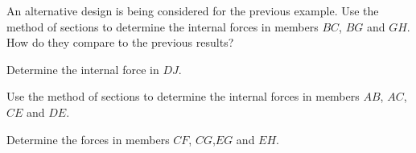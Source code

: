 \documentclass[9pt, xcolor={svgnames, x11names},professionalfonts]{beamer}
\def\scale{1}
\begin{document}
\begin{frame}{}
	\def\scale{0.5125}
	\begin{myexer}{}{}
		\parb\centering
		
		\pars
		An alternative design is being considered for the previous example. 
		Use the method of sections to determine the internal forces in members $BC$, $BG$ and $GH$. How do they compare to the previous results?
		\pars
	\end{myexer}
\end{frame}



\begin{frame}{}
	\def\scale{0.45}
	\begin{myexam}{}{}
		\parb\centering
		
		\parb
		Determine the internal force in $DJ$.
		\pars
	\end{myexam}
\end{frame}

\begin{frame}{}
	\def\scale{0.575}
	
	\begin{myexam}{}{}
		\vspace{-1em}
		\mini[0.5]{
			\parb\centering
					
		}
		\hfill
	\end{myexam}

\end{frame}



\begin{frame}{}
	\def\scale{0.525}
	\begin{myexam}{}{}
		\parb\centering
		
		\pars
		Use the method of sections to determine the internal forces in members $AB$, $AC$, $CE$ and $DE$.
		\pars
	\end{myexam}
\end{frame}

\begin{frame}{}
	\def\scale{0.575}
	
	\begin{myexer}{}{}		
			\centering
			
			\parb		
			Determine the forces in members $CF$, $CG$,$EG$ and $EH$.
			\parb		
		
	\end{myexer}

\end{frame}

%


\end{document}
